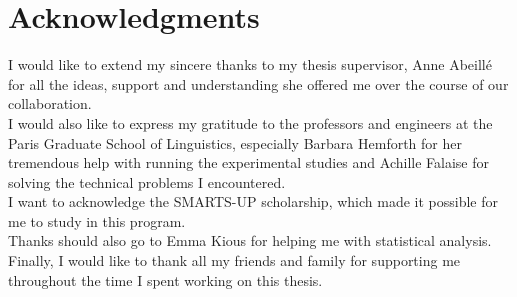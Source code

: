 \chapter*{Acknowledgments}\label{chap:Acknowledgments}

I would like to extend my sincere thanks to my thesis supervisor, Anne Abeillé for all the ideas, support and understanding she offered me over the course of our collaboration.\\

I would also like to express my gratitude to the professors and engineers at the Paris Graduate School of Linguistics, especially Barbara Hemforth for her tremendous help with running the experimental studies and Achille Falaise for solving the technical problems I encountered.\\

I want to acknowledge the SMARTS-UP scholarship, which made it possible for me to study in this program.\\

Thanks should also go to Emma Kious for helping me with statistical analysis.\\

Finally, I would like to thank all my friends and family for supporting me throughout the time I spent working on this thesis.\\
